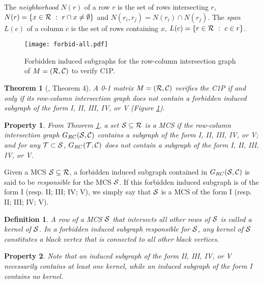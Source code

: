 \documentclass{article}
\newtheorem{definition}{Definition}
\newtheorem{property}{Property}
\newtheorem{theorem}{Theorem}
\begin{document}
The \emph{neighborhood} $N(r)$ of a row $r$ is the set of rows intersecting $r$,
$N(r)= \{x\in {\cal R} ~:~ r\cap x \neq \emptyset\}$ and  
$N(r_i,r_j)= N(r_i)\cap N(r_j)$. The \emph{span} $L(c)$ of a column $c$ 
is the set of rows containing $x$, $L(c)= \{r\in {\cal R} ~:~ c\in r\}$.

\begin{figure}[h]
  \centering
\texttt{[image: forbid-all.pdf]}
\caption{Forbidden induced subgraphs for the row-column intersection graph of $M=({\cal R}, {\cal C})$ to verify C1P.}
 \label{forbid}
\end{figure}

\begin{theorem}[\cite{LB62}, Theorem 4]
\label{thm-fordid}
A 0-1 matrix $M=({\cal R}, {\cal C})$ verifies the C1P if and only 
if its row-column intersection 
graph does not contain a forbidden induced subgraph of the form I, II, III, IV, 
or V (Figure \ref{forbid}).
\end{theorem}

\begin{property}
From Theorem \ref{thm-fordid}, a set ${\cal S} \subseteq {\cal R}$ is a MCS
if the row-column intersection graph $G_{RC}({\cal S},{\cal C})$ contains a 
subgraph of the 
form I, II, III, IV, or V; and for any ${\cal T} \subset {\cal S}$, 
$G_{RC}({\cal T},{\cal C})$ does not contain a subgraph of the form I, II, III, 
IV, or V. 
\label{feat-mcs}
\end{property}

Given a MCS ${\cal S}\subseteq {\cal R}$, a forbidden induced subgraph 
contained in  
$G_{RC}({\cal S},{\cal C})$ is said to be \emph{responsible} for the MCS 
${\cal S}$. 
If this forbidden induced subgraph is of the form I (resp. II; III; IV; V), 
we simply say that ${\cal S}$ is a MCS of the form I (resp. II; III; IV; V).

\begin{definition}
A row of a MCS  ${\cal S}$ that intersects all other rows of ${\cal S}$
is called a \emph{kernel} of ${\cal S}$. In a forbidden  induced subgraph  
responsible for $ {\cal S}$, any kernel of ${\cal S}$ constitutes a  black 
vertex that is connected to all other  black vertices.
\label{def-kernel}
\end{definition}

\begin{property}
Note that an induced subgraph of the form II, III, IV, or V necessarily contains
at least one kernel, while an induced subgraph of the form I contains no kernel.
\label{mcs-kernel}
\end{property}
\end{document}
